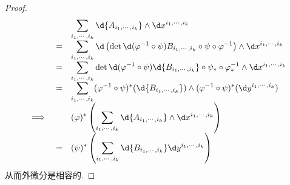 \begin{proof}
\[\begin{array}{>{\displaystyle}c>{\displaystyle}r>{\displaystyle}l}
        &&\sum_{i_1,\cdots,i_k}\d{A_{i_1,\cdots,i_k}}\wedge \d x^{i_1,\cdots,i_k}\\
        &=&\sum_{i_1,\cdots,i_k}\d\left(\det{\d(\varphi^{-1}\circ\psi)}B_{i_1,\cdots,i_k}\circ\psi\circ\varphi^{-1}\right)\wedge \d x^{i_1,\cdots,i_k}\\
        &=&\sum_{i_1,\cdots,i_k}\det{\d(\varphi^{-1}\circ\psi)}\d{B_{i_1,\cdots,i_k}}\circ\psi_*\circ\varphi^{-1}_*\wedge \d x^{i_1,\cdots,i_k}\\
        &=&\sum_{i_1,\cdots,i_k}(\varphi^{-1}\circ\psi)^*(\d{B_{i_1,\cdots,i_k}})\wedge(\varphi^{-1}\circ\psi)^*(\d y^{i_1,\cdots,i_k})\\
        \implies&&(\varphi)^*\left(\sum_{i_1,\cdots,i_k}\d{A_{i_1,\cdots,i_k}}\wedge \d x^{i_1,\cdots,i_k}\right)\\
        &=&(\psi)^*\left(\sum_{i_1,\cdots,i_k}\d{B_{i_1,\cdots,i_k}}\d y^{i_1,\cdots,i_k}\right)
    \end{array}\]
    从而外微分是相容的.


\end{proof}
